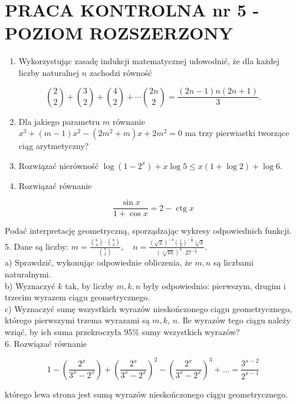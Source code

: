 \documentclass[10pt]{article}
\begin{document}
\section*{PRACA KONTROLNA nr 5 - POZIOM ROZSZERZONY}
\begin{enumerate}
  \item Wykorzystując zasadę indukcji matematycznej udowodnić, że dla każdej liczby naturalnej $n$ zachodzi równość
\end{enumerate}

$$
\binom{2}{2}+\binom{3}{2}+\binom{4}{2}+\cdots\binom{2 n}{2}=\frac{(2 n-1) n(2 n+1)}{3} .
$$

\begin{enumerate}
  \setcounter{enumi}{1}
  \item Dla jakiego parametru $m$ równanie $x^{3}+(m-1) x^{2}-\left(2 m^{2}+m\right) x+2 m^{2}=0$ ma trzy pierwiastki tworzące ciąg arytmetyczny?
  \item Rozwiązać nierówność $\log \left(1-2^{x}\right)+x \log 5 \leqslant x(1+\log 2)+\log 6$.
  \item Rozwiązać równanie
\end{enumerate}

$$
\frac{\sin x}{1+\cos x}=2-\operatorname{ctg} x
$$

Podać interpretację geometryczną, sporządzając wykresy odpowiednich funkcji.\\
5. Dane są liczby: $m=\frac{\binom{6}{4} \cdot\binom{8}{2}}{\binom{7}{3}}, \quad n=\frac{(\sqrt{2})^{-4}\left(\frac{1}{4}\right)^{-\frac{5}{2}} \sqrt[4]{3}}{(\sqrt[4]{16})^{3} \cdot 27^{-\frac{1}{4}}}$.\\
a) Sprawdzić, wykonując odpowiednie obliczenia, że $m, n$ są liczbami naturalnymi.\\
b) Wyznaczyć $k$ tak, by liczby $m, k, n$ były odpowiednio: pierwszym, drugim i trzecim wyrazem ciągu geometrycznego.\\
c) Wyznaczyć sumę wszystkich wyrazów nieskończonego ciągu geometrycznego, którego pierwszymi trzema wyrazami są $m, k$, $n$. Ile wyrazów tego ciągu należy wziąć, by ich suma przekroczyła $95 \%$ sumy wszystkich wyrazów?\\
6. Rozwiązać równanie

$$
1-\left(\frac{2^{x}}{3^{x}-2^{x}}\right)+\left(\frac{2^{x}}{3^{x}-2^{x}}\right)^{2}-\left(\frac{2^{x}}{3^{x}-2^{x}}\right)^{3}+\ldots=\frac{3^{x-2}}{2^{x-1}}
$$

którego lewa strona jest sumą wyrazów nieskończonego ciągu geometrycznego.
\end{document}
